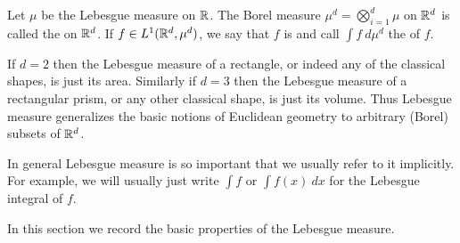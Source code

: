 \begin{definition}
Let $\mu$ be the Lebesgue measure on $\mathbb{R}$.
The Borel measure $\mu^{d} = \bigotimes_{i=1}^{d} \mu$ on $\mathbb{R}^{d}$ is called the  on $\mathbb{R}^{d}$.
If $f \in L^{1}(\mathbb{R}^{d}, \mu^{d})$, we say that $f$ is  and call $\int f~d\mu^{d}$ the  of $f$.
\end{definition}

If $d = 2$ then the Lebesgue measure of a rectangle, or indeed any of the classical shapes, is just its area.
Similarly if $d = 3$ then the Lebesgue measure of a rectangular prism, or any other classical shape, is just its volume.
Thus Lebesgue measure generalizes the basic notions of Euclidean geometry to arbitrary (Borel) subsets of $\mathbb{R}^{d}$.

In general Lebesgue measure is so important that we usually refer to it implicitly.
For example, we will usually just write $\int f$ or $\int f(x) ~dx$ for the Lebesgue integral of $f$.

In this section we record the basic properties of the Lebesgue measure.

